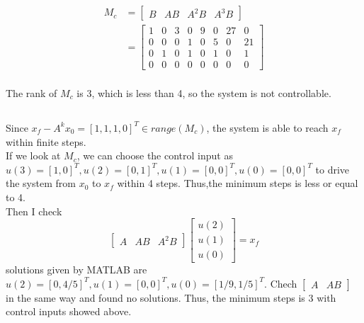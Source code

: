 \documentclass{article}
\begin{document}
\section{}
\subsection{}
\begin{align*}
    M_c&=
    \begin{bmatrix}
        B&AB&A^2B&A^3B
    \end{bmatrix}\\
    &=
    \begin{bmatrix}
        1&0&3&0&9&0&27&0\\
        0&0&0&1&0&5&0&21\\
        0&1&0&1&0&1&0&1\\
        0&0&0&0&0&0&0&0
    \end{bmatrix}
\end{align*}
\\
The rank of $M_c$ is 3, which is less than 4, so the system is not controllable.\\
\subsection{}
Since
$
x_f-A^kx_0=[1,1,1,0]^T\in range(M_c)
$,
the system is able to reach $x_f$ within finite steps.
\\
If we look at $M_c$, we can choose the control input as
$
u(3)=[1,0]^T,u(2)=[0,1]^T,u(1)=[0,0]^T,u(0)=[0,0]^T
$ to drive the system from $x_0$ to $x_f$ within 4 steps.
Thus,the minimum steps is less or equal to 4.\\
Then I check
$$
\begin{bmatrix}
    A&AB&A^2B
\end{bmatrix}
\begin{bmatrix}
    u(2)\\u(1)\\u(0)
\end{bmatrix}
=x_f
$$
solutions given by MATLAB are 
$
u(2)=[0,4/5]^T,u(1)=[0,0]^T,u(0)=[1/9,1/5]^T
$.
Chech
$
\begin{bmatrix}
    A&AB
\end{bmatrix}
$
in the same way and found no solutions. Thus, the minimum steps is 3 with control inputs showed above.
\section{}
\end{document}
